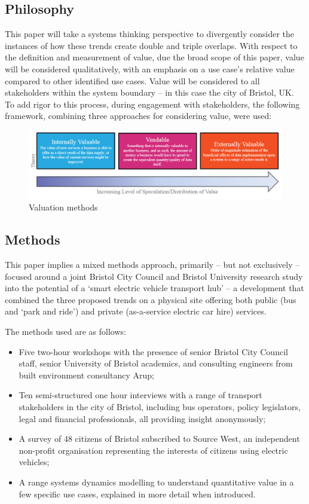 \documentclass[journal]{IEEEtran}
\begin{document}
\subsection{Philosophy}

This paper will take a systems thinking perspective to divergently
consider the instances of how these trends create double and triple
overlaps. With respect to the definition and measurement of value, due
the broad scope of this paper, value will be considered qualitatively,
with an emphasis on a use case's relative value compared to other
identified use cases. Value will be considered to all stakeholders
within the system boundary -- in this case the city of Bristol, UK. To
add rigor to this process, during engagement with stakeholders, the
following framework, combining three approaches for considering value,
were used:

\begin{figure}[!h]
\centering
\includegraphics[width=\columnwidth]{images/valuationmethods.png}
\caption{Valuation methods}
\label{fig:valuationmethods}
\end{figure}


\subsection{Methods}

This paper implies a mixed methods approach, primarily – but not
exclusively -- focused around a joint Bristol City Council and Bristol
University research study into the potential of a `smart electric
vehicle transport hub' -- a development that combined the three
proposed trends on a physical site offering both public (bus and `park
and ride') and private (as-a-service electric car hire) services.

The methods used are as follows:

\begin{itemize}
\item Five two-hour workshops with the presence of senior Bristol City
Council staff, senior University of Bristol academics, and consulting
engineers from built environment consultancy Arup;
\item Ten semi-structured one hour interviews with a range of
transport stakeholders in the city of Bristol, including bus
operators, policy legislators, legal and financial professionals, all
providing insight anonymously;
\item A survey of 48 citizens of Bristol subscribed to Source West, an
independent non-profit organisation representing the interests of
citizens using electric vehicles;
\item A range systems dynamics modelling to understand quantitative
value in a few specific use cases, explained in more detail when
introduced.
\end{itemize}
\end{document}
